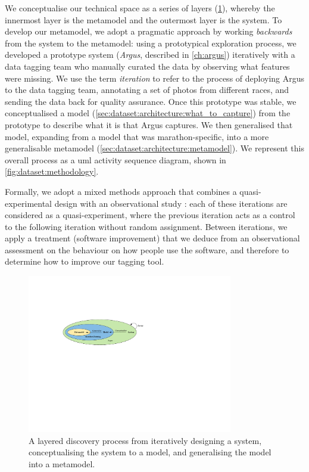 We conceptualise our technical space as a series of layers (\cref{fig:dataset:layers}), whereby the innermost layer is the metamodel and the outermost layer is the system. To develop our metamodel, we adopt a pragmatic approach by working \textit{backwards} from the system to the metamodel: using a prototypical exploration process, we developed a prototype system (\textit{Argus}, described in \cref{ch:argus}) iteratively with a data tagging team who manually curated the data by observing what features were missing. We use the term \textit{iteration} to refer to the process of deploying Argus to the data tagging team, annotating a set of photos from different races, and sending the data back for quality assurance. Once this prototype was stable, we conceptualised a model (\cref{sec:dataset:architecture:what_to_capture}) from the prototype to describe what it is that Argus captures. We then generalised that model, expanding from a model that was marathon-specific, into a more generalisable metamodel (\cref{sec:dataset:architecture:metamodel}). We represent this overall process as a \gls{uml} activity sequence diagram, shown in \cref{fig:dataset:methodology}.

Formally, we adopt a mixed methods approach that combines a quasi-experimental design with an observational study \citep{Trochim:2001wg,Gray:2013va}: each of these iterations are considered as a quasi-experiment, where the previous iteration acts as a control to the following iteration without random assignment. Between iterations, we apply a treatment (software improvement) that we deduce from an observational assessment on the behaviour on how people use the software, and therefore to determine how to improve our tagging tool.

\begin{figure}[h]
  \centering
  \includegraphics[width=0.8\textwidth]{images/dataset/layers}
  \caption[A layered approach to develop our metamodel]{A layered discovery process from iteratively designing a system, conceptualising the system to a model, and generalising the model into a metamodel.}
  \label{fig:dataset:layers}
\end{figure}

